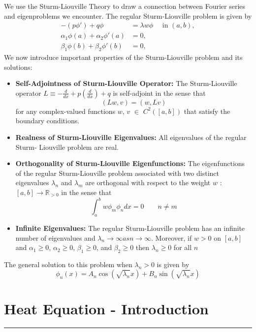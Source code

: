 \documentclass[11pt]{article}
\newcommand{\R}{\mathbb{R}}
\begin{document}
We use the Sturm-Liouville Theory to draw a connection between Fourier series and eigenproblems we encounter. The regular Sturm-Liouville problem is given
by
 \begin{align*}
-(p \phi ') + q\phi &= \lambda w \phi \quad \text{  in  } (a,b), \\
\alpha_1 \phi (a) + \alpha_2 \phi '(a) &= 0, \\
\beta_1 \phi (b) + \beta_2 \phi '(b) &= 0, 
 \end{align*}
We now introduce important properties of the Sturm-Liouville problem and its solutions:
\begin{itemize}
\item \textbf{Self-Adjointness of Sturm-Liouville Operator:} The Sturm-Liouville operator $ L \equiv - \frac{d}{dx} + p (\frac{d}{dx}) + q$ is self-adjoint in the sense that 
$$ (Lw, v) = (w, Lv) $$ 
for any complex-valued functions $w$, $v$ $\in$ $C^2([a,b])$ that satisfy the boundary conditions.
\item \textbf{Realness of Sturm-Liouville Eigenvalues:} All eigenvalues of the regular Sturm- Liouville problem are real.
\item \textbf{Orthogonality of Sturm-Liouville Eigenfunctions:} The eigenfunctions of the regular Sturm-Liouville problem associated with two distinct eigenvalues $\lambda_n$ and $\lambda_m$ are orthogonal with respect to the weight $w$ : $[a, b] \rightarrow \R_{>0}$ in the sense that
$$ \int_a^{b} w \phi_m \phi_n dx = 0 \quad \quad n \neq m $$
\item \textbf{Infinite Eigenvalues:} The regular Sturm-Liouville problem has an infinite number of eigenvalues and $\lambda_n \rightarrow \infty as n \rightarrow \infty$.  Moreover, if $w > 0$ on $[a,b]$ and $\alpha_1 \geq 0$, $\alpha_2 \geq 0$, $\beta_1 \geq 0$, and $\beta_2 \geq 0$ then $\lambda_n \geq 0$ for all $n$
\end{itemize}
The general solution to this problem when $\lambda_n > 0$ is given by
$$ \phi_n(x) = A_n \cos ( \sqrt{\lambda_n} x) + B_n \sin ( \sqrt{\lambda_n} x)$$
\pagebreak


\section{Heat Equation - Introduction}
\hrule \vspace{15pt}
\end{document}
